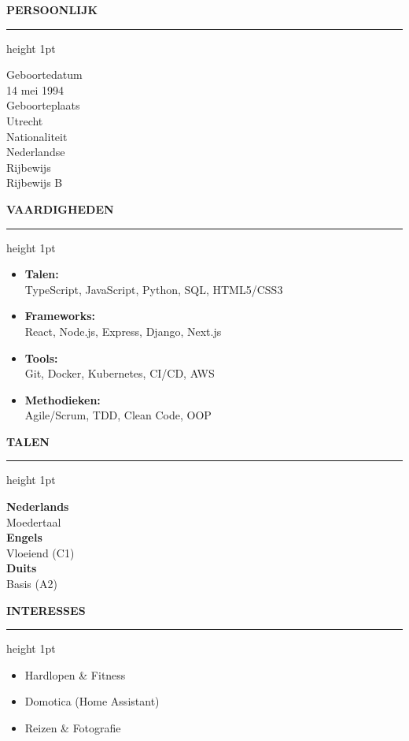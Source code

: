 \documentclass[10pt,a4paper]{article}
\newcommand{\sidebarsection}[1]{%
  \vspace{4mm}%
  {\color{primary}\normalsize\bfseries\MakeUppercase{#1}}%
  \vspace{1.5mm}%
  {\color{accent}\hrule height 1pt}%
  \vspace{2.5mm}%
}
\begin{document}
\begin{minipage}[t]{0.30\textwidth}
  \sidebarsection{Persoonlijk}
  \vspace{1mm}
  {\color{secondary}\footnotesize Geboortedatum} \\
  {\small 14 mei 1994} \\[2.5mm]
  {\color{secondary}\footnotesize Geboorteplaats} \\
  {\small Utrecht} \\[2.5mm]
  {\color{secondary}\footnotesize Nationaliteit} \\
  {\small Nederlandse} \\[2.5mm]
  {\color{secondary}\footnotesize Rijbewijs} \\
  {\small Rijbewijs B}
  
  \sidebarsection{Vaardigheden}
  \begin{itemize}[leftmargin=10pt,topsep=0pt,itemsep=4pt,parsep=0pt]
    \item \small \textbf{Talen:} \\ TypeScript, JavaScript, Python, SQL, HTML5/CSS3
    \item \small \textbf{Frameworks:} \\ React, Node.js, Express, Django, Next.js
    \item \small \textbf{Tools:} \\ Git, Docker, Kubernetes, CI/CD, AWS
    \item \small \textbf{Methodieken:} \\ Agile/Scrum, TDD, Clean Code, OOP
  \end{itemize}

  \sidebarsection{Talen}
  \vspace{1mm}
  \textbf{\small Nederlands} \\
  {\footnotesize Moedertaal} \\[2mm]
  \textbf{\small Engels} \\
  {\footnotesize Vloeiend (C1)} \\[2mm]
  \textbf{\small Duits} \\
  {\footnotesize Basis (A2)}
  
  \sidebarsection{Interesses}
  \begin{itemize}[leftmargin=10pt,topsep=0pt,itemsep=3pt,parsep=0pt]
    \item \small Hardlopen \& Fitness
    \item \small Domotica (Home Assistant)
    \item \small Reizen \& Fotografie
  \end{itemize}
\end{minipage}%
\end{document}
